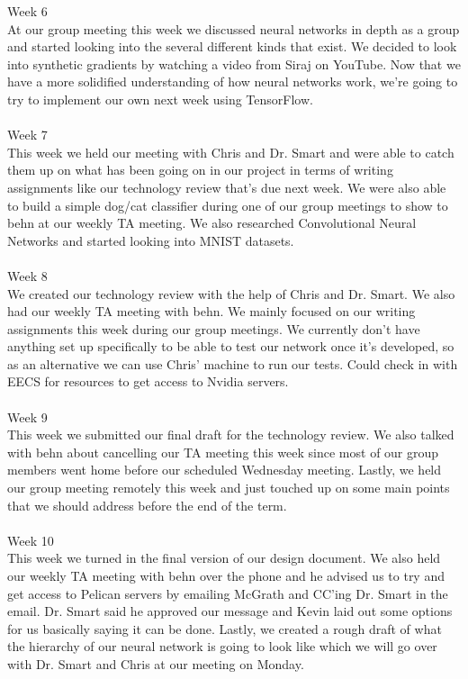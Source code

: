\documentclass[draftclsnofoot, onecolumn, 10pt, compsoc]{IEEEtran}
\begin{document}
  Week 6 \\
\indent At our group meeting this week we discussed neural networks in depth as a group and started looking into the several different kinds that exist. We decided to look into synthetic gradients by watching a video from  Siraj on YouTube. Now that we have a more solidified understanding of how neural networks work, we're going to try to implement our own next week using TensorFlow. \\\\
  Week 7 \\
\indent This week we held our meeting with Chris and Dr. Smart and were able to catch them up on what has been going on in our project in terms of writing assignments like our technology review that's due next week. We were also able to build a simple dog/cat classifier during one of our group meetings to show to behn at our weekly TA meeting. We also researched Convolutional Neural Networks and started looking into MNIST datasets.   \\\\
  Week 8 \\
\indent We created our technology review with the help of Chris and Dr. Smart. We also had our weekly TA meeting with behn. We mainly focused on our writing assignments this week during our group meetings. We currently don’t have anything set up specifically to be able to test our network once it's developed, so as an alternative we can use Chris' machine to run our tests. Could check in with EECS for resources to get access to Nvidia servers.  \\\\
  Week 9 \\
\indent This week we submitted our final draft for the technology review. We also talked with behn about cancelling our TA meeting this week since most of our group members went home before our scheduled Wednesday meeting. Lastly, we held our group meeting remotely this week and just touched up on some main points that we should address before the end of the term. \\\\
  Week 10 \\
\indent This week we turned in the final version of our design document. We also held our weekly TA meeting with behn over the phone and he advised us to try and get access to Pelican servers by emailing McGrath and CC'ing Dr. Smart in the email. Dr. Smart said he approved our message and Kevin laid out some options for us basically saying it can be done. Lastly, we created a rough draft of what the hierarchy of our neural network is going to look like which we will go over with Dr. Smart and Chris at our meeting on Monday.
\end{document}
